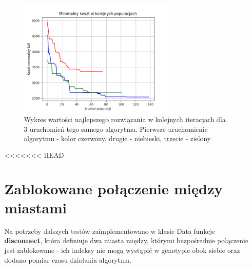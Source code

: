 \documentclass[12pt, oneside, final]{report}
\begin{document}
\begin{figure}[ht!]
\centering
\includegraphics[width=0.7\textwidth]{graphics/diff-population}
\caption{Wykres wartości najlepszego rozwiązania w kolejnych iteracjach dla 3 uruchomień tego samego algorytmu. Pierwsze uruchomienie algorytmu - kolor czerwony, drugie - niebieski, trzecie - zielony}
\label{fig:diff-population}
\end{figure}

<<<<<<< HEAD
\section{Zablokowane połączenie między miastami}
Na potrzeby dalszych testów zaimplementowano w klasie Data funkcje \textbf{disconnect}, która definiuje dwa miasta między, którymi bezpośrednie połączenie jest zablokowane - ich indeksy nie mogą wystąpić w genotypie obok siebie oraz dodano pomiar czasu działania algorytmu.
\end{document}
